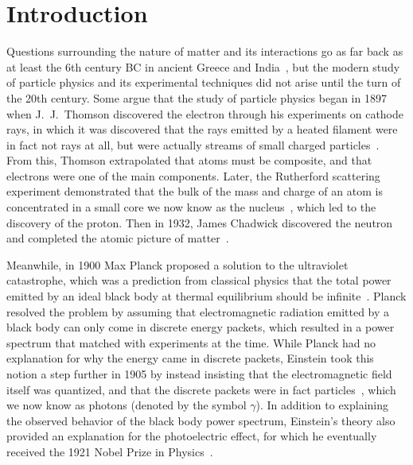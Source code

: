 
\chapter{Introduction}
\label{chap:intro}

Questions surrounding the nature of matter and its interactions go as far back as at least the 6th century BC in ancient Greece and India~\cite{PhysNuclphys196p}, but the modern study of particle physics and its experimental techniques did not arise until the turn of the 20th century. %
Some argue that the study of particle physics began in 1897 when J.\ J.\ Thomson discovered the electron through his experiments on cathode rays, in which it was discovered that the rays emitted by a heated filament were in fact not rays at all, but were actually streams of small charged particles~\cite{doi:10.1080/14786449708621070}.
From this, Thomson extrapolated that atoms must be composite, and that electrons were one of the main components.
Later, the Rutherford scattering experiment demonstrated that the bulk of the mass and charge of an atom is concentrated in a small core we now know as the nucleus~\cite{BargerCollider}, which led to the discovery of the proton.
Then in 1932, James Chadwick discovered the neutron and completed the atomic picture of matter~\cite{weinberg2003discovery}.

Meanwhile, in 1900 Max Planck proposed a solution to the ultraviolet catastrophe, which was a prediction from classical physics that the total power emitted by an ideal black body at thermal equilibrium should be infinite~\cite{schroeder2013introduction}.
Planck resolved the problem by assuming that electromagnetic radiation emitted by a black body can only come in discrete energy packets, which resulted in a power spectrum that matched with experiments at the time.
While Planck had no explanation for why the energy came in discrete packets, Einstein took this notion a step further in 1905 by instead insisting that the electromagnetic field itself was quantized, and that the discrete packets were in fact particles~\cite{doi:10.1002/andp.19053220607}, which we now know as photons (denoted by the symbol $\gamma$).
In addition to explaining the observed behavior of the black body power spectrum, Einstein's theory also provided an explanation for the photoelectric effect, for which he eventually received the 1921 Nobel Prize in Physics~\cite{NobelPrize:1921-Physics}.

